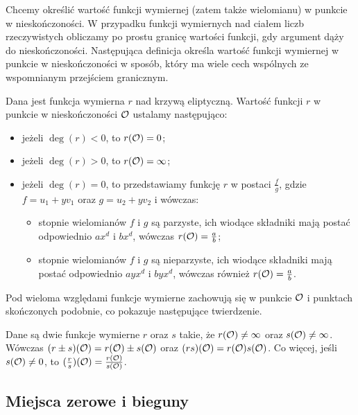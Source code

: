 Chcemy określić wartość funkcji wymiernej (zatem także wielomianu)
w punkcie w nieskończoności.
W przypadku funkcji wymiernych nad ciałem liczb rzeczywistych
obliczamy po prostu granicę wartości funkcji,
gdy argument dąży do nieskończoności.
Następująca definicja określa
wartość funkcji wymiernej w punkcie w nieskończoności w sposób,
który ma wiele cech wspólnych ze wspomnianym przejściem granicznym.

\begin{definition}
Dana jest funkcja wymierna $r$ nad krzywą eliptyczną.
Wartość funkcji $r$ w punkcie w nieskończoności $\mathcal{O}$
ustalamy następująco:
\begin{itemize}
\item jeżeli $\deg(r) < 0$, to $r(\mathcal{O}) = 0$;
\item jeżeli $\deg(r) > 0$, to $r(\mathcal{O}) = \infty$;
\item jeżeli $\deg(r) = 0$,
to przedstawiamy funkcję $r$ w postaci $\frac{f}{g}$,
gdzie $f = u_1 + yv_1$ oraz $g = u_2 + yv_2$
i wówczas:
\begin{itemize}
\item stopnie wielomianów $f$ i $g$ są parzyste,
ich wiodące składniki mają postać odpowiednio $ax^d$ i $bx^d$,
wówczas $r(\mathcal{O}) = \frac{a}{b}$;
\item stopnie wielomianów $f$ i $g$ są nieparzyste,
ich wiodące składniki mają postać odpowiednio $ayx^d$ i $byx^d$,
wówczas również $r(\mathcal{O}) = \frac{a}{b}$.
\end{itemize}
\end{itemize}
\end{definition}

Pod wieloma względami funkcje wymierne zachowują się
w punkcie $\mathcal{O}$ i punktach skończonych podobnie,
co pokazuje następujące twierdzenie.

\begin{theorem}
Dane są dwie funkcje wymierne $r$ oraz $s$ takie,
że $r(\mathcal{O}) \neq \infty$ oraz $s(\mathcal{O}) \neq \infty$.
Wówczas $(r \pm s)(\mathcal{O}) = r(\mathcal{O}) \pm s(\mathcal{O})$
oraz $(rs)(\mathcal{O}) = r(\mathcal{O})s(\mathcal{O})$.
Co więcej, jeśli $s(\mathcal{O}) \neq 0$,
to $(\frac{r}{s})(\mathcal{O}) = \frac{r(\mathcal{O})}{s(\mathcal{O})}$.
\end{theorem}

\subsection*{Miejsca zerowe i bieguny}

